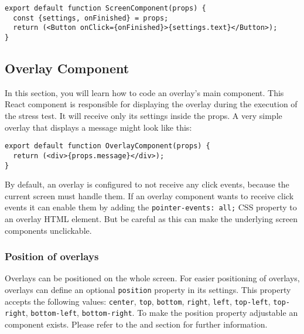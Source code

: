 \begin{verbatim}
export default function ScreenComponent(props) {
  const {settings, onFinished} = props;
  return (<Button onClick={onFinished}>{settings.text}</Button>);
}
\end{verbatim}

\subsection{Overlay Component}
\label{sec:development-overlays}
In this section, you will learn how to code an overlay's main component. 
This React component is responsible for displaying the overlay during the execution of the stress test. 
It will receive only its settings inside the props. 
A very simple overlay that displays a message might look like this:
\begin{verbatim}
export default function OverlayComponent(props) {
  return (<div>{props.message}</div>);
}
\end{verbatim}

By default, an overlay is configured to not receive any click events, because the current screen must handle them. 
If an overlay component wants to receive click events it can enable them by adding the \texttt{pointer-events: all;} CSS property to an overlay HTML element. 
But be careful as this can make the underlying screen components unclickable.

\subsubsection*{Position of overlays}
Overlays can be positioned on the whole screen. 
For easier positioning of overlays, overlays can define an optional \texttt{position} property in its settings. 
This property accepts the following values: 
\texttt{center}, \texttt{top}, \texttt{bottom}, \texttt{right}, \texttt{left}, \texttt{top-left}, \texttt{top-right}, \texttt{bottom-left}, \texttt{bottom-right}.
To make the position property adjustable an  component exists. 
Please refer to the  and  section for further information.

